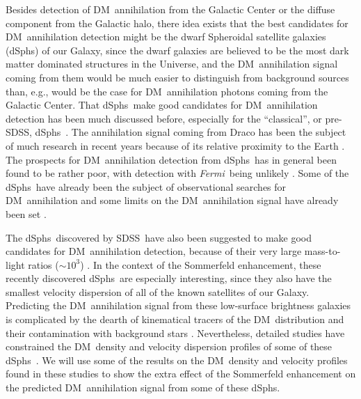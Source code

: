 \documentclass[aps,prd,twocolumn,amsmath,amssymb,floatfix,nofootinbib,10pt]{revtex4}
\newcommand{\eg}{e.g.}
\newcommand{\Fermi}{\emph{Fermi}}
\newcommand{\DM}{DM}
\newcommand{\dSphs}{dSphs}
\newcommand{\SDSS}{SDSS}
\begin{document}
Besides detection of \DM\ annihilation from the Galactic Center or the
diffuse component from the Galactic halo, there idea exists that the
best candidates for \DM\ annihilation detection might be the dwarf
Spheroidal satellite galaxies (\dSphs) of our Galaxy, since the dwarf
galaxies are believed to be the most dark matter dominated structures
in the Universe, and the \DM\ annihilation signal coming from them
would be much easier to distinguish from background sources than, \eg,
would be the case for \DM\ annihilation photons coming from the
Galactic Center. That \dSphs\ make good candidates for \DM\
annihilation detection has been much discussed before, especially for
the ``classical'', or pre-\SDSS, \dSphs\
\cite{2000PhRvD..61b3514B,2002PhRvD..66b3509T,2004PhRvD..70b3512B,2004PhRvD..69l3501E,2004PhRvD..70d3503P,2004PhRvL..93p1302H}. The
annihilation signal coming from Draco has been the subject of much
research in recent years because of its relative proximity to the
Earth
\cite{2002PhRvD..66b3509T,2004PhRvD..70d3503P,2006PhRvD..73f3510B,2006JCAP...03..003P,2007PhRvD..75b3513C,2007PhRvD..76l3509S,2007PhRvD..75h3526S,2008arXiv0812.1494P}. The
prospects for \DM\ annihilation detection from \dSphs\ has in general
been found to be rather poor, with detection with \Fermi\ being
unlikely \cite{2008arXiv0812.1494P}. Some of the \dSphs\ have already
been the subject of observational searches for \DM\ annihilation and
some limits on the \DM\ annihilation signal have already been set
\cite{2008ApJ...678..594W,2008ApJ...679..428A,2008APh....29...55A,2008PhRvD..78h7101D,2009ApJ...691..175A,2008arXiv0810.3561M}.








The \dSphs\ discovered by \SDSS\ have also been suggested to make good
candidates for \DM\ annihilation detection, because of their very
large mass-to-light ratios ($\sim\!10^3$)
\cite{2008ApJ...678..614S,2008arXiv0809.2781G}. In the context of the
Sommerfeld enhancement, these recently discovered \dSphs\ are
especially interesting, since they also have the smallest velocity
dispersion of all of the known satellites of our Galaxy. Predicting
the \DM\ annihilation signal from these low-surface brightness
galaxies is complicated by the dearth of kinematical tracers of the
\DM\ distribution and their contamination with background stars
\cite{2009AJ....137.3109W}. Nevertheless, detailed studies have
constrained the \DM\ density and velocity dispersion profiles of some
of these \dSphs\
\cite{2007PhRvD..75h3526S,2007ApJ...667L..53W,2008ApJ...672..904P}. We
will use some of the results on the \DM\ density and velocity profiles
found in these studies to show the extra effect of the Sommerfeld
enhancement on the predicted \DM\ annihilation signal from some of
these \dSphs.
\end{document}
